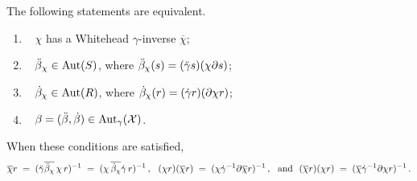 \newpage 
\begin{lem} \label{lem:chi-sigma-rho}
The following statements are equivalent.
\begin{enumerate}[{\rm (i)}]
\item~ 
$\chi$ has a Whitehead $\gamma$-inverse $\overline{\chi}$; 
\item~ 
$\ddot{\beta}{_\chi} \in \mathrm{Aut}(S)$, 
where $\ddot{\beta}_{\chi}(s) = (\ddot{\gamma} s)(\chi \partial s)$;
\item~ 
$\dot{\beta}_{\chi} \in \mathrm{Aut}(R)$,
where $\dot{\beta}_{\chi}(r) = (\dot{\gamma} r)(\partial \chi r)$;
\item~
$\beta = (\ddot{\beta},\dot{\beta}) \in \mathrm{Aut}_{\gamma}(\mathcal{X})$.
\end{enumerate}
When these conditions are satisfied, 
$$
\overline{\chi}r \;=\; ({\ddot{\gamma}\overline{\ddot{\beta}_{\chi}}}\,\chi\,r)^{-1}
                 \;=\; (\chi\,\overline{\dot{\beta}_{\chi}}\dot{\gamma}\,r)^{-1}\,,~~  
(\chi r)(\overline{\chi}r) \;=\; 
(\chi \dot{\gamma}^{-1} \partial \overline{\chi}r)^{-1}\,,
~~\text{and}~~ 
(\overline{\chi}r)(\chi r) \;=\; 
(\overline{\chi} \dot{\gamma}^{-1} \partial \chi r)^{-1}\,. 
$$
\end{lem}
